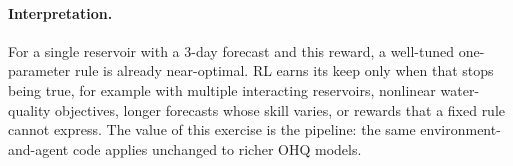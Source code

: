 \paragraph{Interpretation.} For a single reservoir with a 3-day forecast
and this reward, a well-tuned one-parameter rule is already near-optimal.
RL earns its keep only when that stops being true, for example with
multiple interacting reservoirs, nonlinear water-quality objectives,
longer forecasts whose skill varies, or rewards that a fixed rule cannot
express. The value of this exercise is the pipeline: the same
environment-and-agent code applies unchanged to richer OHQ models.
